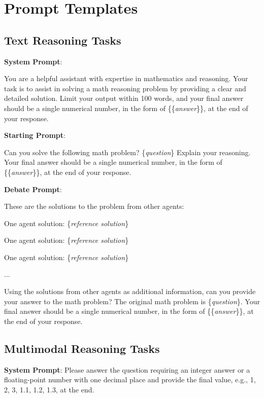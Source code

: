 \documentclass[11pt]{article}
\begin{document}
% 


\appendix

\section{Prompt Templates}
\label{appendix:alignment_prompt_template}

\subsection{Text Reasoning Tasks}

\noindent \textbf{System Prompt}:

\noindent You are a helpful assistant with expertise in mathematics and reasoning. Your task is to assist in solving a math reasoning problem by providing a clear and detailed solution. Limit your output within 100 words, and your final answer should be a single numerical number, in the form of \{\{\textit{answer}\}\}, at the end of your response.

\noindent \textbf{Starting Prompt}:

\noindent Can you solve the following math problem? \{\textit{question}\} Explain your reasoning. Your final answer should be a single numerical number, in the form of \{\{\textit{answer}\}\}, at the end of your response.

\noindent \textbf{Debate Prompt}:

\noindent These are the solutions to the problem from other agents:

\noindent One agent solution: \{\textit{reference solution}\}

\noindent One agent solution: \{\textit{reference solution}\}

\noindent One agent solution: \{\textit{reference solution}\}

\noindent ...

\noindent Using the solutions from other agents as additional information, can you provide your answer to the math problem? The original math problem is \{\textit{question}\}. Your final answer should be a single numerical number, in the form of \{\{\textit{answer}\}\}, at the end of your response.

\subsection{Multimodal Reasoning Tasks}
\noindent \textbf{System Prompt}:
\noindent Please answer the question requiring an integer answer or a floating-point number with one decimal place and provide the final value, e.g., 1, 2, 3, 1.1, 1.2, 1.3, at the end.
\end{document}
